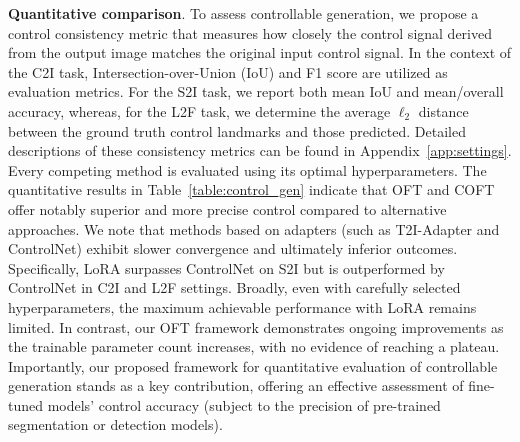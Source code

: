 {\textbf{Quantitative comparison}. To assess controllable generation, we propose a control consistency metric that measures how closely the control signal derived from the output image matches the original input control signal. In the context of the C2I task, Intersection-over-Union (IoU) and F1 score are utilized as evaluation metrics. For the S2I task, we report both mean IoU and mean/overall accuracy, whereas, for the L2F task, we determine the average $\ell_2$ distance between the ground truth control landmarks and those predicted. Detailed descriptions of these consistency metrics can be found in Appendix~\ref{app:settings}. Every competing method is evaluated using its optimal hyperparameters. The quantitative results in Table~\ref{table:control_gen} indicate that OFT and COFT offer notably superior and more precise control compared to alternative approaches. We note that methods based on adapters (such as T2I-Adapter and ControlNet) exhibit slower convergence and ultimately inferior outcomes. Specifically, LoRA surpasses ControlNet on S2I but is outperformed by ControlNet in C2I and L2F settings. Broadly, even with carefully selected hyperparameters, the maximum achievable performance with LoRA remains limited. In contrast, our OFT framework demonstrates ongoing improvements as the trainable parameter count increases, with no evidence of reaching a plateau. Importantly, our proposed framework for quantitative evaluation of controllable generation stands as a key contribution, offering an effective assessment of fine-tuned models’ control accuracy (subject to the precision of pre-trained segmentation or detection models).

}
